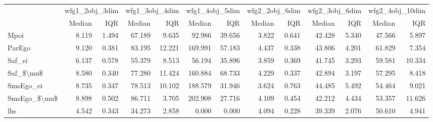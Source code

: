 \begin{tabular}{lrrrrrrrrrrrr}
\toprule
{} & \multicolumn{2}{l}{wfg1\_2obj\_3dim} & \multicolumn{2}{l}{wfg1\_3obj\_4dim} & \multicolumn{2}{l}{wfg1\_4obj\_5dim} & \multicolumn{2}{l}{wfg2\_2obj\_6dim} & \multicolumn{2}{l}{wfg2\_3obj\_6dim} & \multicolumn{2}{l}{wfg2\_4obj\_10dim} \\
{} &         Median &    IQR &         Median &     IQR &         Median &     IQR &         Median &    IQR &         Median &    IQR &          Median &     IQR \\
\midrule
Mpoi         &          8.119 &  1.494 &         67.189 &   9.635 &         92.986 &  39.656 &          3.822 &  0.641 &         42.428 &  5.340 &          47.566 &   5.897 \\
ParEgo       &          9.120 &  0.381 &         83.195 &  12.221 &        169.991 &  57.183 &          4.437 &  0.338 &         43.806 &  4.201 &          61.829 &   7.354 \\
Saf\_ei       &          6.137 &  0.578 &         55.379 &   8.513 &         56.194 &  35.896 &          3.859 &  0.369 &         41.745 &  3.293 &          59.581 &  10.334 \\
Saf\_\$\textbackslash mu\$    &          8.580 &  0.340 &         77.280 &  11.424 &        160.884 &  68.733 &          4.229 &  0.337 &         42.894 &  3.197 &          57.295 &   8.418 \\
SmsEgo\_ei    &          8.735 &  0.347 &         78.513 &  10.102 &        188.579 &  31.946 &          3.624 &  0.763 &         44.485 &  5.492 &          54.464 &   9.021 \\
SmsEgo\_\$\textbackslash mu\$ &          8.898 &  0.502 &         86.711 &   3.705 &        202.908 &  27.716 &          4.109 &  0.454 &         42.212 &  4.434 &          53.357 &  11.626 \\
lhs          &          4.542 &  0.343 &         34.273 &   2.858 &          0.000 &   0.000 &          4.094 &  0.228 &         39.339 &  2.076 &          50.610 &   4.941 \\
\bottomrule
\end{tabular}

